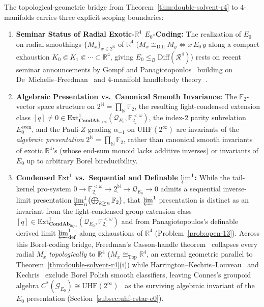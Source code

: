 \begin{remark}\label{rem:exotic-r4-application}%
%
The topological-geometric bridge from Theorem~\ref{thm:double-solvent-r4} to $4$-manifolds carries three explicit scoping boundaries:
\begin{enumerate}
  \item \textbf{Seminar Status of Radial Exotic-$\mathbb{R}^4$ $E_0$-Coding:} The realization of $E_0$ on radial smoothings $\{M_x\}_{x \in 2^{\mathbb{N}}}$ of $\mathbb{R}^4$ ($M_x \cong_{\mathrm{Diff}} M_y \iff x\,E_0\,y$ along a compact exhaustion $K_0 \Subset K_1 \Subset \cdots \subset \mathbb{R}^4$, giving $E_0 \le_B \mathrm{Diff}(\mathcal{R}^4)$) rests on recent seminar announcements by Gompf and Panagiotopoulos~\cite{GompfPanagiotopoulos26} building on De~Michelis--Freedman~\cite{DeMichelisFreedman92} and $4$-manifold handlebody theory~\cite{GompfStipsicz99}.
  \item \textbf{Algebraic Presentation vs.\ Canonical Smooth Invariance:} The $\mathbb{F}_2$-vector space structure on $2^{\mathbb{N}} = \prod_{\mathbb{N}}\mathbb{F}_2$, the resulting light-condensed extension class $[q] \neq 0 \in \mathrm{Ext}^1_{\mathbf{CondAb}_{\mathrm{light}}}(\mathcal{Q}_{E_0}, \underline{\mathbb{F}_2^{<\omega}})$, the index-$2$ parity subrelation $E_0^{\mathrm{even}}$, and the Pauli-$Z$ grading $\alpha_{-1}$ on $\mathrm{UHF}(2^\infty)$ are invariants of the \emph{algebraic presentation} $2^{\mathbb{N}} = \prod_{\mathbb{N}} \mathbb{F}_2$, rather than canonical smooth invariants of exotic $\mathbb{R}^4$'s (whose end-sum monoid lacks additive inverses) or invariants of $E_0$ up to arbitrary Borel bireducibility.
  \item \textbf{Condensed $\mathrm{Ext}^1$ vs.\ Sequential and Definable $\varprojlim^1$:} While the tail-kernel pro-system $0 \to \underline{\mathbb{F}_2^{<\omega}} \to \underline{2^{\mathbb{N}}} \to \mathcal{Q}_{E_0} \to 0$ admits a sequential inverse-limit presentation $\varprojlim^1_n \bigl(\bigoplus_{k \ge n} \mathbb{F}_2\bigr)$, that $\varprojlim^1$ presentation is distinct as an invariant from the light-condensed group extension class $[q] \in \mathrm{Ext}^1_{\mathbf{CondAb}_{\mathrm{light}}}(\mathcal{Q}_{E_0}, \underline{\mathbb{F}_2^{<\omega}})$ and from Panagiotopoulos's definable derived limit $\varprojlim^1_{\mathrm{def}}$ along exhaustions of $\mathbb{R}^4$ (Problem~\ref{prob:open-13}). Across this Borel-coding bridge, Freedman's Casson-handle theorem~\cite{FreedmanQuinn90} collapses every radial $M_x$ \emph{topologically} to $\mathbb{R}^4$ ($M_x \cong_{\mathrm{Top}} \mathbb{R}^4$, an external geometric parallel to Theorem~\ref{thm:double-solvent-r4}(i)) while Harrington--Kechris--Louveau~\cite[Theorem~1.1]{HKL90} and Kechris~\cite[Theorem~8.46]{Kechris95} exclude Borel Polish smooth classifiers, leaving Connes's groupoid algebra $C^*(\mathcal{G}_{E_0}) \cong \mathrm{UHF}(2^\infty)$~\cite{Connes94} as the surviving algebraic invariant of the $E_0$ presentation (Section~\ref{subsec:uhf-cstar-e0}).
\end{enumerate}
\end{remark}

